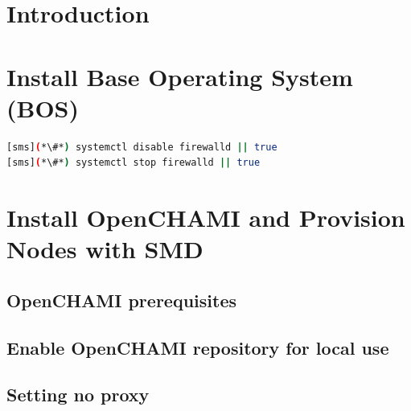 \documentclass{ohpc-doc}
\newcommand{\OpenCHAMI}{OpenCHAMI}
\begin{document}

\chapter{Introduction} \label{sec:introduction}








\chapter{Install Base Operating System (BOS)}


\begin{lstlisting}[language=bash,keywords={}]
[sms](*\#*) systemctl disable firewalld || true
[sms](*\#*) systemctl stop firewalld || true
\end{lstlisting}


\chapter{Install \OpenCHAMI{} and Provision Nodes with SMD}\label{sec:provision_compute_bos}


\section{\OpenCHAMI{} prerequisites}\label{sec:openchami_prerequisites}


\section{Enable \OpenCHAMI{} repository for local use}\label{sec:enable_openchami}


\section{Setting no proxy}\label{sec:openchami_noproxy}

\end{document}
